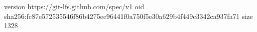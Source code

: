 version https://git-lfs.github.com/spec/v1
oid sha256:fc87e572535546f86b4275ee96441f0a750f5e30a629b4f449c3342ca937fa71
size 1328
